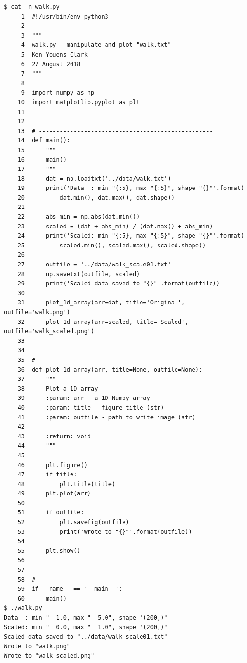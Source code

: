 \documentclass[10pt]{article}
\begin{document}
\begin{enumerate}
\begin{verbatim}
$ cat -n walk.py
     1	#!/usr/bin/env python3
     2	
     3	"""
     4	walk.py - manipulate and plot "walk.txt"
     5	Ken Youens-Clark
     6	27 August 2018
     7	"""
     8	
     9	import numpy as np
    10	import matplotlib.pyplot as plt
    11	
    12	
    13	# --------------------------------------------------
    14	def main():
    15	    """
    16	    main()
    17	    """
    18	    dat = np.loadtxt('../data/walk.txt')
    19	    print('Data  : min "{:5}, max "{:5}", shape "{}"'.format(
    20	        dat.min(), dat.max(), dat.shape))
    21	
    22	    abs_min = np.abs(dat.min())
    23	    scaled = (dat + abs_min) / (dat.max() + abs_min)
    24	    print('Scaled: min "{:5}, max "{:5}", shape "{}"'.format(
    25	        scaled.min(), scaled.max(), scaled.shape))
    26	
    27	    outfile = '../data/walk_scale01.txt'
    28	    np.savetxt(outfile, scaled)
    29	    print('Scaled data saved to "{}"'.format(outfile))
    30	
    31	    plot_1d_array(arr=dat, title='Original', outfile='walk.png')
    32	    plot_1d_array(arr=scaled, title='Scaled', outfile='walk_scaled.png')
    33	
    34	
    35	# --------------------------------------------------
    36	def plot_1d_array(arr, title=None, outfile=None):
    37	    """
    38	    Plot a 1D array
    39	    :param: arr - a 1D Numpy array
    40	    :param: title - figure title (str)
    41	    :param: outfile - path to write image (str)
    42	
    43	    :return: void
    44	    """
    45	
    46	    plt.figure()
    47	    if title:
    48	        plt.title(title)
    49	    plt.plot(arr)
    50	
    51	    if outfile:
    52	        plt.savefig(outfile)
    53	        print('Wrote to "{}"'.format(outfile))
    54	
    55	    plt.show()
    56	
    57	
    58	# --------------------------------------------------
    59	if __name__ == '__main__':
    60	    main()
$ ./walk.py
Data  : min " -1.0, max "  5.0", shape "(200,)"
Scaled: min "  0.0, max "  1.0", shape "(200,)"
Scaled data saved to "../data/walk_scale01.txt"
Wrote to "walk.png"
Wrote to "walk_scaled.png"

\end{verbatim}


\end{enumerate}
\end{document}
